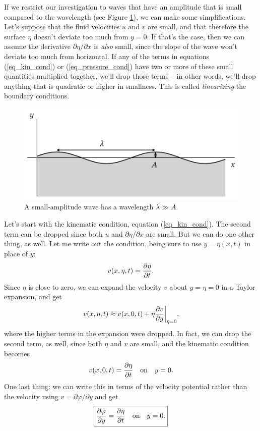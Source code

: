 If we restrict our investigation to waves that have an amplitude that is small compared to the wavelength (see Figure \ref{fig_small_wave}), we can make some simplifications.  Let's suppose that the fluid velocities $u$ and $v$ are small, and that therefore the surface $\eta$ doesn't deviate too much from $y = 0$.  If that's the case, then we can assume the derivative $\partial \eta / \partial x$ is \emph{also} small, since the slope of the wave won't deviate too much from horizontal.  If any of the terms in equations (\ref{eq_kin_cond}) or (\ref{eq_pressure_cond}) have two or more of these small quantities multiplied together, we'll drop those terms -- in other words, we'll drop anything that is quadratic or higher in smallness.  This is called \emph{linearizing} the boundary conditions.

\begin{figure}
\centering\includegraphics[width=0.8\linewidth]{Figures/Chapter5/fig_small_wave}
\caption{A small-amplitude wave has a wavelength $\lambda \gg A$.}
\label{fig_small_wave}
\end{figure}

Let's start with the kinematic condition, equation (\ref{eq_kin_cond}).  The second term can be dropped since both $u$ and $\partial \eta / \partial x$ are small.  But we can do one other thing, as well.  Let me  write out the condition, being sure to use $y = \eta(x, t)$ in place of $y$:
\[
v(x, \eta, t) = \frac{\partial {\eta}}{\partial {t}}.
\]
Since $\eta$ is close to zero, we can expand the velocity $v$ about $y = \eta = 0$ in a Taylor expansion, and get
\[
v(x, \eta, t) \approx v(x, 0, t) + \eta \frac{\partial {v}}{\partial {y}} \bigg|_{\eta=0},
\]
where the higher terms in the expansion were dropped.  In fact, we can drop the second term, as well, since both $\eta$ and $v$ are small, and the kinematic condition becomes
\[
v(x, 0, t) = \frac{\partial {\eta}}{\partial {t}} \quad \text{on} \quad y=0.
\]
One last thing: we can write this in terms of the velocity potential rather than the velocity using $v = \partial \varphi / \partial y$ and get
\begin{equation}
\label{eq_kin_cond_lin}
\boxed{
\frac{\partial {\varphi}}{\partial {y}} = \frac{\partial {\eta}}{\partial {t}} \quad \text{on} \quad y=0.
}
\end{equation}

